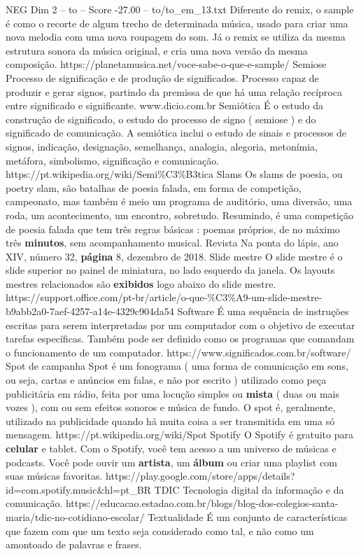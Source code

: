 \begin{textsample}{NEG Dim 2 – to – Score -27.00 – to/to\_em\_13.txt}
Diferente do remix, o sample é como o recorte de algum trecho de determinada música, usado para criar uma nova melodia com uma nova roupagem do som.
Já o remix se utiliza da mesma estrutura sonora da música original, e cria uma nova versão da mesma composição. https://planetamusica.net/voce-sabe-o-que-e-sample/ Semiose Processo de significação e de produção de significados.
Processo capaz de produzir e gerar signos, partindo da premissa de que há uma relação recíproca entre significado e significante. www.dicio.com.br Semiótica É o estudo da construção de significado, o estudo do processo de signo ( semiose ) e do significado de comunicação.
A semiótica inclui o estudo de sinais e processos de signos, indicação, designação, semelhança, analogia, alegoria, metonímia, metáfora, simbolismo, significação e comunicação. https://pt.wikipedia.org/wiki/Semi\%C3\%B3tica Slams Os slams de poesia, ou poetry slam, são batalhas de poesia falada, em forma de competição, campeonato, mas também é meio um programa de auditório, uma diversão, uma roda, um acontecimento, um encontro, sobretudo.
Resumindo, é uma competição de poesia falada que tem três regras básicas : poemas próprios, de no máximo três \textbf{minutos}, sem acompanhamento musical.
Revista Na ponta do lápis, ano XIV, número 32, \textbf{página} 8, dezembro de 2018.
Slide mestre O slide mestre é o slide superior no painel de miniatura, no lado esquerdo da janela.
Os layouts mestres relacionados são \textbf{exibidos} logo abaixo do slide mestre. https://support.office.com/pt-br/article/o-que-\%C3\%A9-um-slide-mestre-b9abb2a0-7aef-4257-a14e-4329c904da54 Software É uma sequência de instruções escritas para serem interpretadas por um computador com o objetivo de executar tarefas específicas.
Também pode ser definido como os programas que comandam o funcionamento de um computador. https://www.significados.com.br/software/ Spot de campanha Spot é um fonograma ( uma forma de comunicação em sons, ou seja, cartas e anúncios em falas, e não por escrito ) utilizado como peça publicitária em rádio, feita por uma locução simples ou \textbf{mista} ( duas ou mais vozes ), com ou sem efeitos sonoros e música de fundo.
O spot é, geralmente, utilizado na publicidade quando há muita coisa a ser transmitida em uma só mensagem. https://pt.wikipedia.org/wiki/Spot Spotify O Spotify é gratuito para \textbf{celular} e tablet.
Com o Spotify, você tem acesso a um universo de músicas e podcasts.
Você pode ouvir um \textbf{artista}, um \textbf{álbum} ou criar uma playlist com suas músicas favoritas. https://play.google.com/store/apps/details? id=com.spotify.music\&hl=pt\_BR TDIC Tecnologia digital da informação e da comunicação. https://educacao.estadao.com.br/blogs/blog-dos-colegios-santa-maria/tdic-no-cotidiano-escolar/ Textualidade É um conjunto de características que fazem com que um texto seja considerado como tal, e não como um amontoado de palavras e frases.

\end{textsample}

